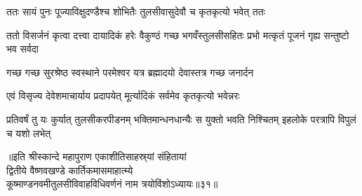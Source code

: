 \twolineshloka
{ततः सायं पुनः पूज्याविक्षुदण्डैश्च शोभितैः}
{तुलसीवासुदेवौ च कृतकृत्यो भवेत् ततः} %

\threelineshloka
{ततो विसर्जनं कृत्वा दत्त्वा दायादिकं हरेः}
{वैकुण्ठं गच्छ भगवँस्तुलसीसहितः प्रभो}
{मत्कृतं पूजनं गृह्य सन्तुष्टो भव सर्वदा} %

\twolineshloka
{गच्छ गच्छ सुरश्रेष्ठ स्वस्थाने परमेश्वर}
{यत्र ब्रह्मादयो देवास्तत्र गच्छ जनार्दन} %

\twolineshloka
{एवं विसृज्य देवेशमाचार्याय प्रदापयेत्}
{मूर्त्यादिकं सर्वमेव कृतकृत्यो भवेन्नरः} %

\threelineshloka
{प्रतिवर्षं तु यः कुर्यात् तुलसीकरपीडनम्}
{भक्तिमान्धनधान्यैः स युक्तो भवति निश्चितम्}
{इहलोके परत्रापि विपुलं च यशो लभेत्} %


॥इति श्रीस्कान्दे महापुराण एकाशीतिसाहस्र्यां संहितायां\\ द्वितीये वैष्णवखण्डे कार्तिकमासमाहात्म्ये\\कूष्माण्डनवमीतुलसीविवाहविधिवर्णनं नाम त्रयोविंशोऽध्यायः॥३१॥